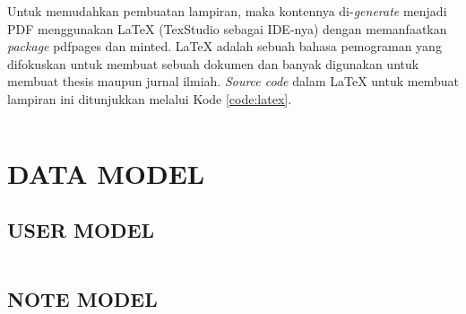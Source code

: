 \documentclass{article}
\title{\vspace{-5ex} \bfseries {\sc{LAMPIRAN}}}
\date{\vspace{-10ex}}
\newenvironment{multipageListing}{
	\setstretch{1}
	\captionsetup{type=listing, justification=centering, skip=-5pt}
}{}
\begin{document}
	\maketitle
	Untuk memudahkan pembuatan lampiran, maka kontennya di-\textit{generate} menjadi PDF menggunakan LaTeX (TexStudio sebagai IDE-nya) dengan memanfaatkan \textit{package} pdfpages dan minted.  LaTeX adalah sebuah bahasa pemograman yang difokuskan untuk membuat sebuah dokumen dan banyak digunakan untuk membuat thesis maupun jurnal ilmiah. \textit{Source code} dalam LaTeX untuk membuat lampiran ini ditunjukkan melalui Kode \ref*{code:latex}.
	\begin{multipageListing}
		\inputminted{latex}{generatePDF.tex}
	\end{multipageListing}
	
	
	

	
	

	\section{DATA MODEL}
		\subsection{USER MODEL}
		\begin{multipageListing}
			\inputminted{kotlin}{codes/UserModel.kt}
		\end{multipageListing}
	
		\subsection{NOTE MODEL}
		\begin{multipageListing}
			\inputminted{kotlin}{codes/NoteModel.kt}
		\end{multipageListing}
\end{document}
